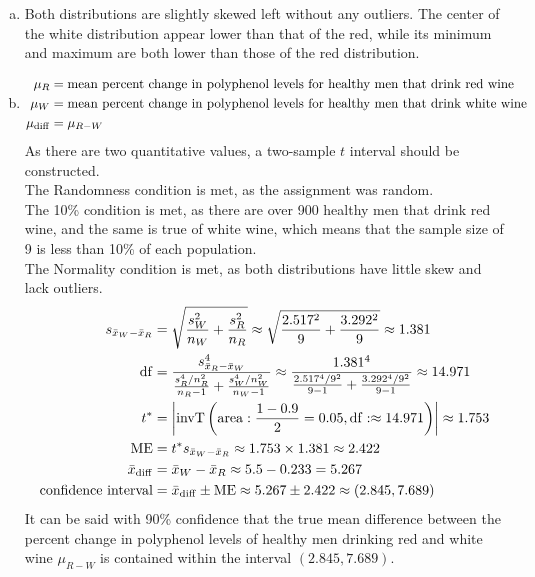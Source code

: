 \documentclass[../Homework]{subfiles}
\begin{document}
				\begin{enumerate}[a.]
					\item
						Both distributions are slightly skewed left without any outliers. The center of the white distribution appear lower than that of the red, while its minimum and maximum are both lower than those of the red distribution. \\
					\item
						\begin{align*}
							\mu_R &= \text{mean percent change in polyphenol levels for healthy men that drink red wine} \\
							\mu_W &= \text{mean percent change in polyphenol levels for healthy men that drink white wine} \\
							\mu_{\mathrm{diff}} &= \mu_{R - W}
						\end{align*}
						As there are two quantitative values, a two-sample $t$ interval should be constructed. \\
						The Randomness condition is met, as the assignment was random. \\
						The 10\% condition is met, as there are over 900 healthy men that drink red wine, and the same is true of white wine, which means that the sample size of 9 is less than 10\% of each population. \\
						The Normality condition is met, as both distributions have little skew and lack outliers.
						\begin{align*}
							s_{\bar{x}_W - \bar{x}_R} &= \sqrt{\frac{s_W^2}{n_W} + \frac{s_R^2}{n_R}} \approx \sqrt{\frac{2.517^2}{9} + \frac{3.292^2}{9}} \approx 1.381 \\
							\operatorname{df} &= \frac{s_{\bar{x}_R - \bar{x}_W}^4}{\frac{s_R^4/n_R^2}{n_R - 1} + \frac{s_W^4/n_W^2}{n_W - 1}} \approx \frac{1.381^4}{\frac{2.517^4/9^2}{9 - 1} + \frac{3.292^4/9^2}{9 - 1}} \approx 14.971 \\
							t^* &= \left|\operatorname{invT}\left(\operatorname{area}: \frac{1 - 0.9}{2} = 0.05, \operatorname{df}: \approx 14.971\right)\right| \approx  1.753 \\
							\operatorname{ME} &= t^*s_{\bar{x}_W - \bar{x}_R} \approx 1.753 \times 1.381 \approx 2.422 \\
							\bar{x}_{\mathrm{diff}} &= \bar{x}_W - \bar{x}_R \approx 5.5 - 0.233 = 5.267 \\
							\text{confidence interval} &= \bar{x}_{\mathrm{diff}} \pm \operatorname{ME} \approx 5.267 \pm 2.422 \approx (2.845, 7.689)
						\end{align*}
						It can be said with 90\% confidence that the true mean difference between the percent change in polyphenol levels of healthy men drinking red and white wine $\mu_{R - W}$ is contained within the interval $(2.845, 7.689)$.
				\end{enumerate}
\end{document}
